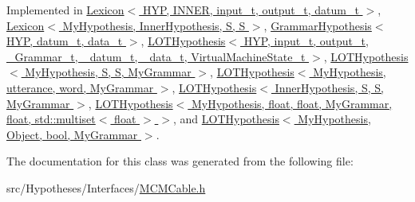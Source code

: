 Implemented in \hyperlink{class_lexicon_ac8577ba9b4554ebf1852020c617bd7df}{Lexicon$<$ H\+Y\+P, I\+N\+N\+E\+R, input\+\_\+t, output\+\_\+t, datum\+\_\+t $>$}, \hyperlink{class_lexicon_ac8577ba9b4554ebf1852020c617bd7df}{Lexicon$<$ My\+Hypothesis, Inner\+Hypothesis, S, S $>$}, \hyperlink{class_grammar_hypothesis_aa0d96def3fe7e22a2bbf2c89ba996bcf}{Grammar\+Hypothesis$<$ H\+Y\+P, datum\+\_\+t, data\+\_\+t $>$}, \hyperlink{class_l_o_t_hypothesis_a0791b7ba0105870a2094877445570b61}{L\+O\+T\+Hypothesis$<$ H\+Y\+P, input\+\_\+t, output\+\_\+t, \+\_\+\+Grammar\+\_\+t, \+\_\+datum\+\_\+t, \+\_\+data\+\_\+t, Virtual\+Machine\+State\+\_\+t $>$}, \hyperlink{class_l_o_t_hypothesis_a0791b7ba0105870a2094877445570b61}{L\+O\+T\+Hypothesis$<$ My\+Hypothesis, S, S, My\+Grammar $>$}, \hyperlink{class_l_o_t_hypothesis_a0791b7ba0105870a2094877445570b61}{L\+O\+T\+Hypothesis$<$ My\+Hypothesis, utterance, word, My\+Grammar $>$}, \hyperlink{class_l_o_t_hypothesis_a0791b7ba0105870a2094877445570b61}{L\+O\+T\+Hypothesis$<$ Inner\+Hypothesis, S, S, My\+Grammar $>$}, \hyperlink{class_l_o_t_hypothesis_a0791b7ba0105870a2094877445570b61}{L\+O\+T\+Hypothesis$<$ My\+Hypothesis, float, float, My\+Grammar, float, std\+::multiset$<$ float $>$ $>$}, and \hyperlink{class_l_o_t_hypothesis_a0791b7ba0105870a2094877445570b61}{L\+O\+T\+Hypothesis$<$ My\+Hypothesis, Object, bool, My\+Grammar $>$}.



The documentation for this class was generated from the following file\+:\begin{DoxyCompactItemize}
\item 
src/\+Hypotheses/\+Interfaces/\hyperlink{_m_c_m_cable_8h}{M\+C\+M\+Cable.\+h}\end{DoxyCompactItemize}
